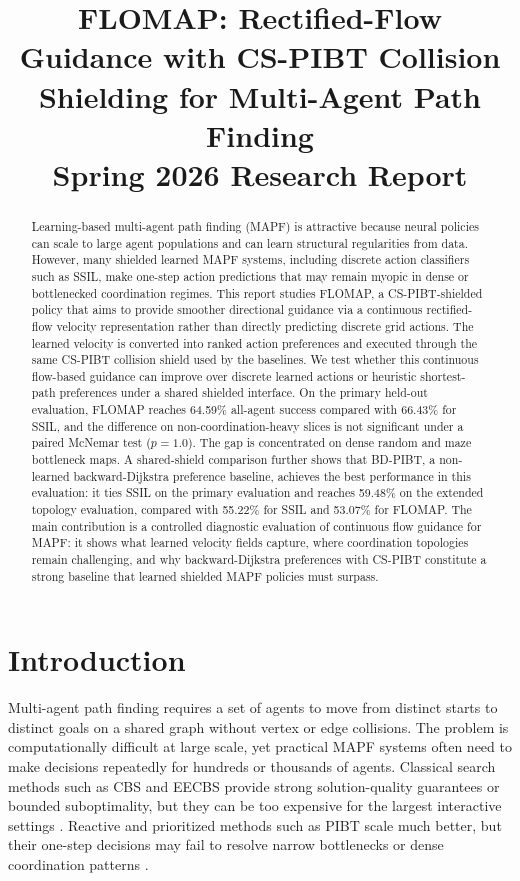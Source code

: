 \documentclass[conference]{IEEEtran}
\title{FLOMAP: Rectified-Flow Guidance with CS-PIBT Collision Shielding for Multi-Agent Path Finding\\[0.25em]
{\large Spring 2026 Research Report}}
\author{
\IEEEauthorblockN{
\begin{tabular}{@{}c@{}}
\begin{tabular}{c}
Barathkrishna Satheeshkumar\\
Carnegie Mellon University\\
\texttt{bsathees@andrew.cmu.edu}
\end{tabular}
\\[0.9em]
\begin{tabular}{@{}c@{\hspace{3.5em}}c@{}}
\begin{tabular}{c}
Maxim Likhachev\\
Advisor, Carnegie Mellon University\\
\texttt{maxim@cs.cmu.edu}
\end{tabular}
&
\begin{tabular}{c}
Matthew Travers\\
Advisor, Carnegie Mellon University\\
\texttt{mtravers@andrew.cmu.edu}
\end{tabular}
\end{tabular}
\end{tabular}
}
}
\begin{document}
\maketitle

\begin{abstract}
Learning-based multi-agent path finding (MAPF) is attractive because neural
policies can scale to large agent populations and can learn structural
regularities from data.  However, many shielded learned MAPF systems, including
discrete action classifiers such as SSIL, make one-step action predictions that
may remain myopic in dense or bottlenecked coordination regimes.  This report
studies FLOMAP, a CS-PIBT-shielded policy that aims to provide smoother
directional guidance via a continuous rectified-flow velocity representation
rather than directly predicting discrete grid actions.  The learned velocity is
converted into ranked action preferences and executed through the same CS-PIBT
collision shield used by the baselines.  We test whether this continuous
flow-based guidance can improve over discrete learned actions or heuristic
shortest-path preferences under a shared shielded interface.  On the primary
held-out evaluation, FLOMAP
reaches 64.59\% all-agent success compared with 66.43\% for SSIL, and the
difference on non-coordination-heavy slices is not significant under a paired
McNemar test ($p=1.0$).  The
gap is concentrated on dense random and maze bottleneck maps.  A shared-shield
comparison further shows that BD-PIBT, a non-learned backward-Dijkstra
preference baseline, achieves the best performance in this evaluation:
it ties SSIL on the primary evaluation and reaches 59.48\% on the extended
topology evaluation, compared with 55.22\% for SSIL and 53.07\% for FLOMAP.  The
main contribution is a controlled diagnostic evaluation of continuous flow
guidance for MAPF: it shows what learned velocity fields capture, where
coordination topologies remain challenging, and why backward-Dijkstra
preferences with CS-PIBT constitute a strong baseline that learned shielded MAPF
policies must surpass.
\end{abstract}

\section{Introduction}

Multi-agent path finding requires a set of agents to move from distinct starts to
distinct goals on a shared graph without vertex or edge collisions.  The problem
is computationally difficult at large scale, yet practical MAPF systems often
need to make decisions repeatedly for hundreds or thousands of agents.  Classical
search methods such as CBS and EECBS provide strong solution-quality guarantees
or bounded suboptimality, but they can be too expensive for the largest
interactive settings \cite{sharon2015cbs,li2021eecbs}.  Reactive and prioritized
methods such as PIBT scale much better, but their one-step decisions may fail
to resolve narrow bottlenecks or dense coordination patterns
\cite{okumura2019pibt}.
\end{document}
